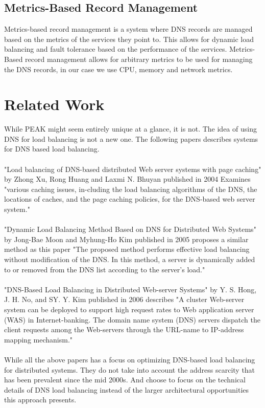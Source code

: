 \documentclass[12pt]{article}
\begin{document}
\subsection{Metrics-Based Record Management}
    Metrics-based record management is a system where DNS records are managed based on the metrics of the services they point to.
    This allows for dynamic load balancing and fault tolerance based on the performance of the services. Metrics-Based record management
    allows for arbitrary metrics to be used for managing the DNS records, in our case we use CPU, memory and network metrics.

\section{Related Work}
While PEAK might seem entirely unique at a glance, it is not. The idea of using DNS for load balancing is not a new one.
The following papers describes systems for DNS based load balancing.
\\
\\
"Load balancing of DNS-based distributed Web server systems with page caching"\cite{xuLoadBalancingDNSbased2004} by Zhong Xu, Rong Huang and Laxmi N. Bhuyan published in 2004
Examines "various caching issues, in-cluding the load balancing algorithms of the DNS, the locations of caches, and the page caching policies, for the DNS-based web server system."
\\
\\
"Dynamic Load Balancing Method Based on DNS for Distributed Web Systems"\cite{moonDynamicLoadBalancing2005} 
by Jong-Bae Moon and Myhung-Ho Kim published in 2005
proposes a similar method as this paper "The proposed
method performs effective load balancing without modification of the
DNS. In this method, a server is dynamically added to or removed from
the DNS list according to the server’s load."
\\
\\
"DNS-Based Load Balancing in Distributed Web-server Systems"\cite{hongDNSbasedLoadBalancing2006} by Y. S. Hong, J. H. No, and SY. Y. Kim
published in 2006 describes "A cluster Web-server system can be deployed to support high request rates to Web application server (WAS) in Internet-banking. 
The domain name system (DNS) servers dispatch the client requests among the Web-servers through the URL-name to IP-address mapping mechanism."
\\
\\
While all the above papers has a focus on optimizing DNS-based load balancing for distributed systems.
They do not take into account the address scarcity that has been prevalent since the mid 2000s.
And choose to focus on the technical details of DNS load balancing instead of the larger architectural
opportunities this approach presents.
\end{document}

